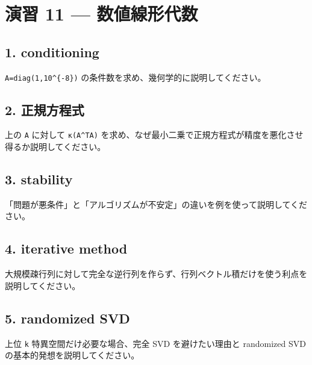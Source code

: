\documentclass[
  11pt,
  a4paper,
]{ltjsarticle}
\author{}
\date{}
\begin{document}
\hypertarget{ux6f14ux7fd2-11-ux6570ux5024ux7ddaux5f62ux4ee3ux6570}{%
\section{演習 11 ---
数値線形代数}\label{ux6f14ux7fd2-11-ux6570ux5024ux7ddaux5f62ux4ee3ux6570}}

\hypertarget{conditioning}{%
\subsection{1. conditioning}\label{conditioning}}

\texttt{A=diag(1,10\^{}\{-8\})}
の条件数を求め、幾何学的に説明してください。

\hypertarget{ux6b63ux898fux65b9ux7a0bux5f0f}{%
\subsection{2. 正規方程式}\label{ux6b63ux898fux65b9ux7a0bux5f0f}}

上の \texttt{A} に対して \texttt{κ(A\^{}TA)}
を求め、なぜ最小二乗で正規方程式が精度を悪化させ得るか説明してください。

\hypertarget{stability}{%
\subsection{3. stability}\label{stability}}

「問題が悪条件」と「アルゴリズムが不安定」の違いを例を使って説明してください。

\hypertarget{iterative-method}{%
\subsection{4. iterative method}\label{iterative-method}}

大規模疎行列に対して完全な逆行列を作らず、行列ベクトル積だけを使う利点を説明してください。

\hypertarget{randomized-svd}{%
\subsection{5. randomized SVD}\label{randomized-svd}}

上位 \texttt{k} 特異空間だけ必要な場合、完全 SVD を避けたい理由と
randomized SVD の基本的発想を説明してください。
\end{document}

